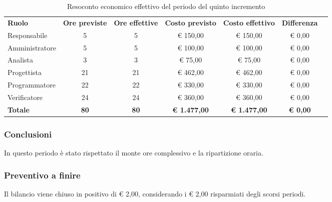\documentclass[../piano-di-progetto.tex]{subfiles}
\begin{document}
  \begin{table}[H]
    \centering
    \begin{tabular}{lcccccc}
      \rowcolor{lightgray}
      \textbf{Ruolo}  & \textbf{Ore previste} & \textbf{Ore effettive} & \textbf{Costo previsto} & \textbf{Costo effettivo} & \textbf{Differenza} \\
Responsabile    & 5           & 5           & € 150,00            & € 150,00            & € 0,00          \\
Amministratore  & 5           & 5           & € 100,00            & € 100,00            & € 0,00          \\
Analista        & 3           & 3           & € 75,00             & € 75,00             & € 0,00          \\
Progettista     & 21          & 21          & € 462,00            & € 462,00            & € 0,00          \\
Programmatore   & 22          & 22          & € 330,00            & € 330,00            & € 0,00          \\
Verificatore    & 24          & 24          & € 360,00            & € 360,00            & € 0,00          \\
\textbf{Totale} & \textbf{80} & \textbf{80} & \textbf{€ 1.477,00} & \textbf{€ 1.477,00} & \textbf{€ 0,00}

    \end{tabular}
    \caption{Resoconto economico effettivo del periodo del quinto incremento}
  \end{table}


\subsubsection{Conclusioni}
In questo periodo è stato rispettato il monte ore complessivo e la ripartizione oraria.

\subsubsection{Preventivo a finire}
Il bilancio viene chiuso in positivo di € 2,00, considerando i € 2,00 risparmiati degli scorsi periodi. 
\end{document}
